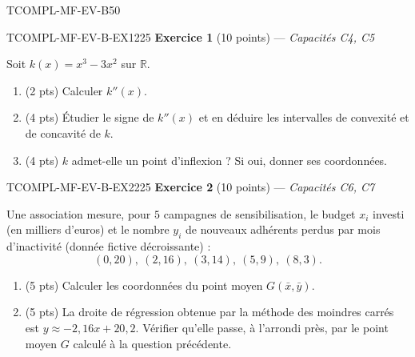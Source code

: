 

\begin{evaluation}{TCOMPL-MF-EV-B}{50}

\begin{exercice}{TCOMPL-MF-EV-B-EX1}{2}{25}
\textbf{Exercice 1} (10 points) --- \textit{Capacités C4, C5}

\medskip

Soit $k(x) = x^3 - 3x^2$ sur $\mathbb{R}$.
\begin{enumerate}
  \item (2 pts) Calculer $k''(x)$.
  \item (4 pts) Étudier le signe de $k''(x)$ et en déduire les intervalles de convexité et de concavité de $k$.
  \item (4 pts) $k$ admet-elle un point d'inflexion ? Si oui, donner ses coordonnées.
\end{enumerate}
\end{exercice}

\begin{exercice}{TCOMPL-MF-EV-B-EX2}{2}{25}
\textbf{Exercice 2} (10 points) --- \textit{Capacités C6, C7}

\medskip

Une association mesure, pour $5$ campagnes de sensibilisation, le budget $x_i$ investi (en milliers d'euros) et le nombre $y_i$ de nouveaux adhérents perdus par mois d'inactivité (donnée fictive décroissante) :
\[
  (0,20),\ (2,16),\ (3,14),\ (5,9),\ (8,3).
\]
\begin{enumerate}
  \item (5 pts) Calculer les coordonnées du point moyen $G(\bar{x}, \bar{y})$.
  \item (5 pts) La droite de régression obtenue par la méthode des moindres carrés est $y \approx -2{,}16x + 20{,}2$. Vérifier qu'elle passe, à l'arrondi près, par le point moyen $G$ calculé à la question précédente.
\end{enumerate}
\end{exercice}

\end{evaluation}
